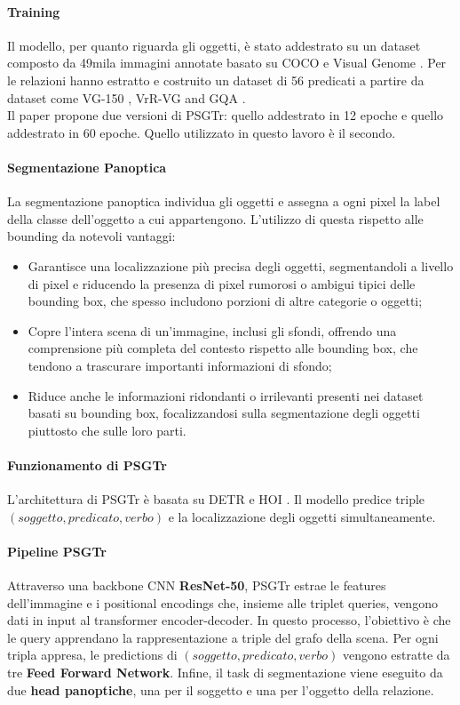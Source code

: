 \paragraph*{Training}
Il modello, per quanto riguarda gli oggetti, è stato addestrato su un dataset composto da 49mila immagini annotate basato su COCO \cite{coco} e Visual Genome \cite{visualgenemo}. Per le relazioni hanno estratto e costruito un dataset di 56 predicati a partire da dataset come VG-150 \cite{vg150}, VrR-VG \cite{vrvvg} and GQA \cite{cqa}.\\
Il paper propone due versioni di PSGTr: quello addestrato in 12 epoche e quello addestrato in 60 epoche. Quello utilizzato in questo lavoro è il secondo.

\paragraph*{Segmentazione Panoptica}
La segmentazione panoptica individua gli oggetti e assegna a ogni pixel la label della classe dell'oggetto a cui appartengono. L'utilizzo di questa rispetto alle bounding da notevoli vantaggi:
\begin{itemize}
  \item Garantisce una localizzazione più precisa degli oggetti, segmentandoli a livello di pixel e riducendo la presenza di pixel rumorosi o ambigui tipici delle bounding box, che spesso includono porzioni di altre categorie o oggetti;
  \item Copre l'intera scena di un'immagine, inclusi gli sfondi, offrendo una comprensione più completa del contesto rispetto alle bounding box, che tendono a trascurare importanti informazioni di sfondo;
  \item Riduce anche le informazioni ridondanti o irrilevanti presenti nei dataset basati su bounding box, focalizzandosi sulla segmentazione degli oggetti piuttosto che sulle loro parti.
\end{itemize}
\paragraph*{Funzionamento di PSGTr}
L'architettura di PSGTr è basata su DETR \cite{detr} e HOI \cite{hoi}. Il modello predice triple $(soggetto, predicato, verbo)$ e la localizzazione degli oggetti simultaneamente.
\paragraph*{Pipeline PSGTr}
Attraverso una \gls{backbone} CNN \textbf{ResNet-50}, PSGTr estrae le features dell'immagine e i positional encodings che, insieme alle triplet queries, vengono dati in input al transformer encoder-decoder. In questo processo, l'obiettivo è che le query apprendano la rappresentazione a triple del grafo della scena. Per ogni tripla appresa, le predictions di  $(soggetto, predicato, verbo)$ vengono estratte da tre \textbf{Feed Forward Network}. Infine, il task di segmentazione viene eseguito da due \textbf{head panoptiche}, una per il soggetto e una per l'oggetto della relazione.

